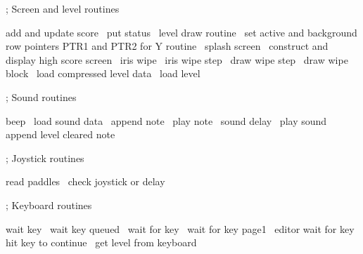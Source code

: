 \documentclass[10pt]{report}%
\begin{document}
    ; Screen and level routines

    \LA{}add and update score~{\nwtagstyle{}}\RA{}
    \LA{}put status~{\nwtagstyle{}}\RA{}
    \LA{}level draw routine~{\nwtagstyle{}}\RA{}
    \LA{}set active and background row pointers \code{}PTR1\edoc{} and \code{}PTR2\edoc{} for \code{}Y\edoc{} routine~{\nwtagstyle{}}\RA{}
    \LA{}splash screen~{\nwtagstyle{}}\RA{}
    \LA{}construct and display high score screen~{\nwtagstyle{}}\RA{}
    \LA{}iris wipe~{\nwtagstyle{}}\RA{}
    \LA{}iris wipe step~{\nwtagstyle{}}\RA{}
    \LA{}draw wipe step~{\nwtagstyle{}}\RA{}
    \LA{}draw wipe block~{\nwtagstyle{}}\RA{}
    \LA{}load compressed level data~{\nwtagstyle{}}\RA{}
    \LA{}load level~{\nwtagstyle{}}\RA{}

    ; Sound routines

    \LA{}beep~{\nwtagstyle{}}\RA{}
    \LA{}load sound data~{\nwtagstyle{}}\RA{}
    \LA{}append note~{\nwtagstyle{}}\RA{}
    \LA{}play note~{\nwtagstyle{}}\RA{}
    \LA{}sound delay~{\nwtagstyle{}}\RA{}
    \LA{}play sound~{\nwtagstyle{}}\RA{}
    \LA{}append level cleared note~{\nwtagstyle{}}\RA{}

    ; Joystick routines

    \LA{}read paddles~{\nwtagstyle{}}\RA{}
    \LA{}check joystick or delay~{\nwtagstyle{}}\RA{}

    ; Keyboard routines

    \LA{}wait key~{\nwtagstyle{}}\RA{}
    \LA{}wait key queued~{\nwtagstyle{}}\RA{}
    \LA{}wait for key~{\nwtagstyle{}}\RA{}
    \LA{}wait for key page1~{\nwtagstyle{}}\RA{}
    \LA{}editor wait for key~{\nwtagstyle{}}\RA{}
    \LA{}hit key to continue~{\nwtagstyle{}}\RA{}
    \LA{}get level from keyboard~{\nwtagstyle{}}\RA{}
\end{document}
